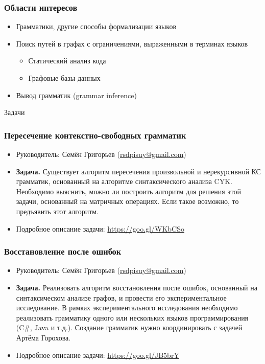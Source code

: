 \documentclass{beamer}
\begin{document}
\begin{frame}[fragile]
  \transwipe[direction=90]
  \frametitle{Области интересов}
  \begin{itemize}
    \item Грамматики, другие способы формализации языков
    \item Поиск путей в графах с ограничениями, выраженными в терминах языков
    \begin{itemize}
      \item Статический анализ кода
      \item Графовые базы данных
    \end{itemize}
    \item Вывод грамматик (grammar inference)
  \end{itemize}
\end{frame}

\begin{frame}[plain,c]
 \transwipe[direction=90]
 \begin{center}
  \Huge Задачи
 \end{center}
\end{frame}

\begin{frame}
  \transwipe[direction=90]
  \frametitle{Пересечение контекстно-свободных грамматик}
  \begin{itemize}
    \item Руководитель: Семён Григорьев (\url{rsdpisuy@gmail.com})
    \item \textbf{Задача.} Существует алгоритм пересечения произвольной и нерекурсивной КС грамматик, основанный на алгоритме синтаксического анализа CYK. 
    Необходимо выяснить, можно ли построить алгоритм для решения этой задачи, основанный на матричных операциях. Если такое возможно, то предъявить этот алгоритм.   
    \item Подробное описание задачи: \url{https://goo.gl/WKbCSo}
  \end{itemize}
\end{frame}

\begin{frame}
  \transwipe[direction=90]
  \frametitle{Восстановление после ошибок}
  \begin{itemize}
    \item Руководитель: Семён Григорьев (\url{rsdpisuy@gmail.com})
    \item \textbf{Задача.} Реализовать алгоритм восстановления после ошибок, основанный на синтаксическом анализе графов, и провести его экспериментальное исследование.
    В рамках экспериментального исследования необходимо реализовать грамматику одного или нескольких языков программирования (C\#, Java и т.д.).
    Создание грамматик нужно координировать с задачей Артёма Горохова. 
    \item Подробное описание задачи: \url{https://goo.gl/JB5brY}
  \end{itemize}
\end{frame}
\end{document}
